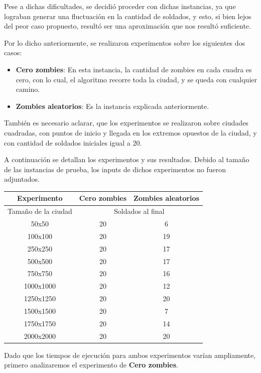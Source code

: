 Pese a dichas dificultades, se decidió proceder con dichas instancias, ya que lograban generar una fluctuación en la cantidad de soldados, y esto, si bien lejos del peor caso propuesto, resultó ser una aproximación que nos resultó suficiente.

Por lo dicho anteriormente, se realizaron experimentos sobre los siguientes dos casos:
\begin{itemize}
	\item \textbf{Cero zombies}: En esta instancia, la cantidad de zombies en cada cuadra es cero, con lo cual, el algoritmo recorre toda la ciudad, y se queda con cualquier camino.
	\item \textbf{Zombies aleatorios}: Es la instancia explicada anteriormente.
\end{itemize}

También es necesario aclarar, que los experimentos se realizaron sobre ciudades cuadradas, con puntos de inicio y llegada en los extremos opuestos de la ciudad, y con cantidad de soldados iniciales igual a 20.

A continuación se detallan los experimentos y sus resultados.
Debido al tamaño de las instancias de prueba, los inputs de dichos experimentos no fueron adjuntados.
\begin{center}
	\begin{tabular}{|c|c|c|}
	\hline
	Experimento & \textbf{Cero zombies} & \textbf{Zombies aleatorios}\\
	\hline
	\hline
	Tamaño de la ciudad & \multicolumn{2}{|c|}{Soldados al final}\\
	\hline
	50x50 & 20 & 6\\
	\hline
	100x100 & 20 & 19\\
	\hline
	250x250 & 20 & 17\\
	\hline
	500x500 & 20 & 17\\
	\hline
	750x750 & 20 & 16\\
	\hline
	1000x1000 & 20 & 12\\
	\hline
	1250x1250 & 20 & 20\\
	\hline
	1500x1500 & 20 & 7\\
	\hline
	1750x1750 & 20 & 14\\
	\hline
	2000x2000 & 20 & 20\\
	\hline
	\end{tabular}
\end{center}

Dado que los tiempos de ejecución para ambos experimentos varían ampliamente, primero analizaremos el experimento de \textbf{Cero zombies}.

